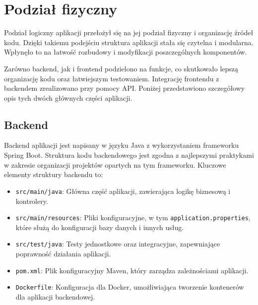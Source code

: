 \section{Podział fizyczny}
Podział logiczny aplikacji przełożył się na jej podział fizyczny i organizację źródeł kodu. Dzięki takiemu podejściu struktura aplikacji stała się czytelna i modularna. Wpłynęło to na łatwość rozbudowy i modyfikacji poszczególnych komponentów. 

Zarówno backend, jak i frontend podzielono na funkcje, co skutkowało lepszą organizację kodu oraz łatwiejszym testowaniem. Integrację frontendu z backendem zrealizowano przy pomocy API. Poniżej przedstawiono szczegółowy opis tych dwóch głównych części aplikacji.

\subsection{Backend}
Backend aplikacji jest napisany w języku Java z wykorzystaniem frameworku Spring Boot. Struktura kodu backendowego jest zgodna z najlepszymi praktykami w zakresie organizacji projektów opartych na tym frameworku. Kluczowe elementy struktury backendu to:
\begin{itemize}
    \item \texttt{src/main/java}: Główna część aplikacji, zawierająca logikę biznesową i kontrolery.
    \item \texttt{src/main/resources}: Pliki konfiguracyjne, w tym \texttt{application.properties}, które służą do konfiguracji bazy danych i innych usług.
    \item \texttt{src/test/java}: Testy jednostkowe oraz integracyjne, zapewniające poprawność działania aplikacji.
    \item \texttt{pom.xml}: Plik konfiguracyjny Maven, który zarządza zależnościami aplikacji.
    \item \texttt{Dockerfile}: Konfiguracja dla Docker, umożliwiająca tworzenie kontenerów dla aplikacji backendowej.
\end{itemize}

